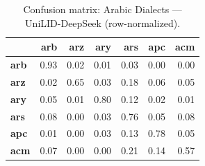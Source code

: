 \begin{table}[htbp]
\centering
\small
\begin{tabular}{lrrrrrr}
\toprule
 & \textbf{arb} & \textbf{arz} & \textbf{ary} & \textbf{ars} & \textbf{apc} & \textbf{acm} \\
\midrule
\textbf{arb} & \cellcolor{blue!92}\color{white}0.93 & \cellcolor{blue!2}0.02 & \cellcolor{blue!1}0.01 & \cellcolor{blue!3}0.03 & \cellcolor{blue!0}0.00 & \cellcolor{blue!0}0.00 \\
\textbf{arz} & \cellcolor{blue!2}0.02 & \cellcolor{blue!64}\color{white}0.65 & \cellcolor{blue!3}0.03 & \cellcolor{blue!18}0.18 & \cellcolor{blue!6}0.06 & \cellcolor{blue!4}0.05 \\
\textbf{ary} & \cellcolor{blue!4}0.05 & \cellcolor{blue!0}0.01 & \cellcolor{blue!79}\color{white}0.80 & \cellcolor{blue!12}0.12 & \cellcolor{blue!1}0.02 & \cellcolor{blue!1}0.01 \\
\textbf{ars} & \cellcolor{blue!8}0.08 & \cellcolor{blue!0}0.00 & \cellcolor{blue!2}0.03 & \cellcolor{blue!75}\color{white}0.76 & \cellcolor{blue!5}0.05 & \cellcolor{blue!8}0.08 \\
\textbf{apc} & \cellcolor{blue!1}0.01 & \cellcolor{blue!0}0.00 & \cellcolor{blue!3}0.03 & \cellcolor{blue!12}0.13 & \cellcolor{blue!78}\color{white}0.78 & \cellcolor{blue!4}0.05 \\
\textbf{acm} & \cellcolor{blue!7}0.07 & \cellcolor{blue!0}0.00 & \cellcolor{blue!0}0.00 & \cellcolor{blue!21}0.21 & \cellcolor{blue!14}0.14 & \cellcolor{blue!57}\color{white}0.57 \\
\bottomrule
\end{tabular}
\caption{Confusion matrix: Arabic Dialects — UniLID-DeepSeek (row-normalized).}
\label{tab:cm-arabic_dialects-unilid-deepseek}
\end{table}

